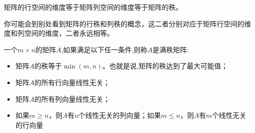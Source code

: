 \begin{theorem}
    矩阵的行空间的维度等于矩阵列空间的维度等于矩阵的秩。
\end{theorem}

你可能会到别处看到矩阵的行秩和列秩的概念，这二者分别对应于矩阵行空间的维度和列空间的维度，二者永远相等。

\begin{definition}
    一个$m\times n$的矩阵$A$,如果满足以下任一条件,则称$A$是\textcolor{third}{满秩矩阵}:
    \begin{itemize}
        \item 矩阵$A$的秩等于$\min(m,n)$。也就是说,矩阵的秩达到了最大可能值；
        \item 矩阵$A$的所有行向量线性无关；
        \item 矩阵$A$的所有列向量线性无关；
        \item 如果$m\geq n$，则$A$有$n$个线性无关的列向量；如果$m \leq n$，则$A$有$m$个线性无关的行向量
    \end{itemize}
\end{definition}




